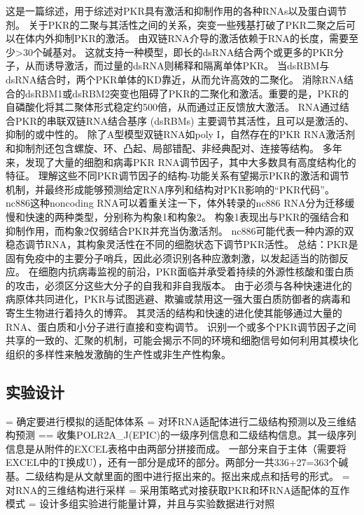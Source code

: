 \newline \indent 这是一篇综述，用于综述对PKR具有激活和抑制作用的各种RNAs以及蛋白调节剂。
\newline \indent 关于PKR的二聚与其活性之间的关系，突变一些残基打破了PKR二聚之后可以在体内外抑制PKR的激活。
\newline \indent 由双链RNA介导的激活依赖于RNA的长度，需要至少>30个碱基对。
这就支持一种模型，即长的dsRNA结合两个或更多的PKR分子，从而诱导激活，而过量的dsRNA则稀释和隔离单体PKR。
当dsRBM与dsRNA结合时，两个PKR单体的KD靠近，从而允许高效的二聚化。
消除RNA结合的dsRBM1或dsRBM2突变也阻碍了PKR的二聚化和激活。重要的是，PKR的自磷酸化将其二聚体形式稳定约500倍，从而通过正反馈放大激活。
\newline \indent RNA通过结合PKR的串联双链RNA结合基序 (dsRBMs) 主要调节其活性，且可以是激活的、抑制的或中性的。
除了A型模型双链RNA如poly I，自然存在的PKR RNA激活剂和抑制剂还包含螺旋、环、凸起、局部错配、非经典配对、连接等结构。
\newline \indent 多年来，发现了大量的细胞和病毒PKR RNA调节因子，其中大多数具有高度结构化的特征。
理解这些不同PKR调节因子的结构-功能关系有望揭示PKR的激活和调节机制，并最终形成能够预测给定RNA序列和结构对PKR影响的“PKR代码”。
\newline \indent nc886这种noncoding RNA可以着重关注一下，体外转录的nc886 RNA分为迁移缓慢和快速的两种类型，分别称为构象1和构象2。
构象1表现出与PKR的强结合和抑制作用，而构象2仅弱结合PKR并充当伪激活剂。
nc886可能代表一种内源的双稳态调节RNA，其构象灵活性在不同的细胞状态下调节PKR活性。
\newline \indent 总结：PKR是固有免疫中的主要分子哨兵，因此必须识别各种应激刺激，以发起适当的防御反应。
在细胞内抗病毒监视的前沿，PKR面临并承受着持续的外源性核酸和蛋白质的攻击，必须区分这些大分子的自我和非自我版本。
由于必须与各种快速进化的病原体共同进化，PKR与试图逃避、欺骗或禁用这一强大蛋白质防御者的病毒和寄生生物进行着持久的博弈。
其灵活的结构和快速的进化使其能够通过大量的RNA、蛋白质和小分子进行直接和变构调节。
识别一个或多个PKR调节因子之间共享的一致的、汇聚的机制，可能会揭示不同的环境和细胞信号如何利用其模块化组织的多样性来触发激酶的生产性或非生产性构象。
\subsection{实验设计}
\noindent = 确定要进行模拟的适配体体系
\newline = 对环RNA适配体进行二级结构预测以及三维结构预测
\newline == 收集POLR2A\_J(EPIC)的一级序列信息和二级结构信息。其一级序列信息是从附件的EXCEL表格中由两部分拼接而成。
一部分来自于主体（需要将EXCEL中的T换成U），还有一部分是成环的部分。两部分一共336+27=363个碱基。二级结构是从文献里面的图中进行抠出来的。抠出来成点和括号的形式。
\newline = 对RNA的三维结构进行采样
\newline = 采用策略式对接获取PKR和环RNA适配体的互作模式
\newline = 设计多组实验进行能量计算，并且与实验数据进行对照

